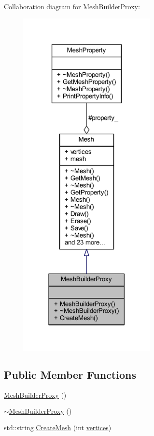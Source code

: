 Collaboration diagram for Mesh\+Builder\+Proxy\+:\nopagebreak
\begin{figure}[H]
\begin{center}
\leavevmode
\includegraphics[width=197pt]{class_mesh_builder_proxy__coll__graph}
\end{center}
\end{figure}
\subsection*{Public Member Functions}
\begin{DoxyCompactItemize}
\item 
\mbox{\hyperlink{class_mesh_builder_proxy_a4401f9a56170b3d4e5efca1f4d689be0}{Mesh\+Builder\+Proxy}} ()
\item 
\mbox{\hyperlink{class_mesh_builder_proxy_abc3f41500a0dd22d857ad9f380969fd6}{$\sim$\+Mesh\+Builder\+Proxy}} ()
\item 
std\+::string \mbox{\hyperlink{class_mesh_builder_proxy_aeef3c361967a22015c6bd314e3b473e7}{Create\+Mesh}} (int \mbox{\hyperlink{class_mesh_a922390e7245b484961cf4f6e9e37c9dd}{vertices}})
\end{DoxyCompactItemize}
